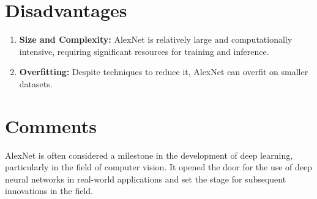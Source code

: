 \section{Disadvantages}
\begin{enumerate}
    \item \textbf{Size and Complexity:} AlexNet is relatively large and computationally intensive, requiring significant resources for training and inference.
    \item \textbf{Overfitting:} Despite techniques to reduce it, AlexNet can overfit on smaller datasets.
\end{enumerate}


\section{Comments}
AlexNet is often considered a milestone in the development of deep learning, particularly in the field of computer vision. It opened the door for the use of deep neural networks in real-world applications and set the stage for subsequent innovations in the field.
